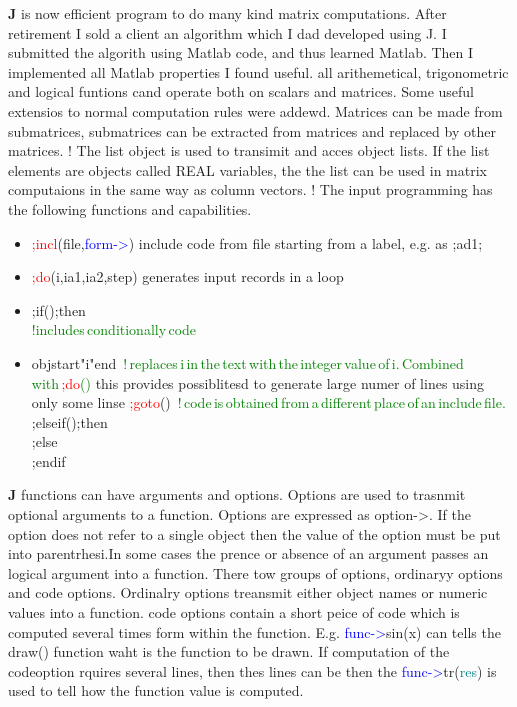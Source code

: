 \textbf{J} is now efficient program to do many kind matrix computations. After retirement I sold a client
an algorithm which I dad developed using J. I submitted the algorith using Matlab code,
and thus learned Matlab. Then I implemented all Matlab properties I found useful.
all arithemetical, trigonometric and logical funtions cand operate both on scalars and matrices.
Some useful extensios to normal computation rules were addewd. Matrices can be made
from submatrices, submatrices can be extracted from matrices and replaced by other
matrices.
!
The list object is used to transimit and acces object lists. If the list elements are
objects called REAL variables, the the list can be used in matrix computaions
in the same way as column vectors.
!
The input programming  has the following functions and capabilities.
\begin{itemize}
\item \textcolor{Red}{;incl}(file,\textcolor{blue}{form->}) include code from file starting from a label, e.g. as ;ad1;
\item \textcolor{Red}{;do}(i,ia1,ia2,step) generates input records in a loop
\item ;if();then \\ \textcolor{green}{!includes\,conditionally\,code}
\item objstart"i"end \,\textcolor{green}{!\,replaces\,i\,in\,the\,text\,with\,the\,integer\,value\,of\,i.\,Combined\,with\,\textcolor{Red}{;do}()}
this provides possiblitesd to generate large numer of lines using only some linse
\textcolor{Red}{;goto}() \,\textcolor{green}{!\,code\,is\,obtained\,from\,a\,different\,place\,of\,an\,include\,file.}
;elseif();then \\
;else \\
;endif
\end{itemize}

\textbf{J} functions can have arguments and options. Options are used to trasnmit optional arguments
to a function. Options are expressed as option->. If the option does not refer to a single object then
the value of the option must be put into parentrhesi.In some cases the prence or absence of an argument passes an logical
argument into a function. There tow groups of options, ordinaryy options and code options.
Ordinalry options treansmit either object names or numeric values into a function.
code options contain a short peice of code which is computed several times form within the function.
E.g. \textcolor{blue}{func->}\textcolor{VioletRed}{sin}(x) can tells the \textcolor{VioletRed}{draw}() function waht is the function to be drawn. If
computation of the codeoption rquires several lines, then thes lines can be
then the \textcolor{blue}{func->}tr(\textcolor{teal}{res}) is used to tell how the function value is computed.
